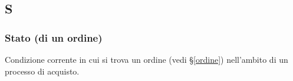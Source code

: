 \subsection{S}
\subsubsection{Stato (di un ordine)}
Condizione corrente in cui si trova un ordine (vedi \S\ref{ordine}) nell'ambito
di un processo di acquisto.

\newpage
